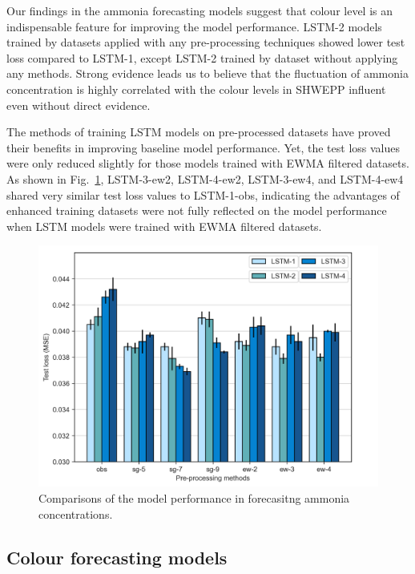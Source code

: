 Our findings in the ammonia forecasting models suggest that colour level is an indispensable feature for improving the model performance. LSTM-2 models trained by datasets applied with any pre-processing techniques showed lower test loss compared to LSTM-1, except LSTM-2 trained by dataset without applying any methods. Strong evidence leads us to believe that the fluctuation of ammonia concentration is highly correlated with the colour levels in SHWEPP influent even without direct evidence.

The methods of training LSTM models on pre-processed datasets have proved their benefits in improving baseline model performance. Yet, the test loss values were only reduced slightly for those models trained with EWMA filtered datasets. As shown in Fig.~\ref{fig:nh3-feature-engineering}, LSTM-3-ew2, LSTM-4-ew2, LSTM-3-ew4, and LSTM-4-ew4 shared very similar test loss values to LSTM-1-obs, indicating the advantages of enhanced training datasets were not fully reflected on the model performance when LSTM models were trained with EWMA filtered datasets.

\begin{figure}[!ht]
    \centering
    \includegraphics[width=1.0\columnwidth]{imgs/results/feature-engineering/nh3-input-1-4-comparison.png}
    \caption{Comparisons of the model performance in forecasitng ammonia concentrations.}
    \label{fig:nh3-feature-engineering}
 \end{figure}

\subsection{Colour forecasting models}

